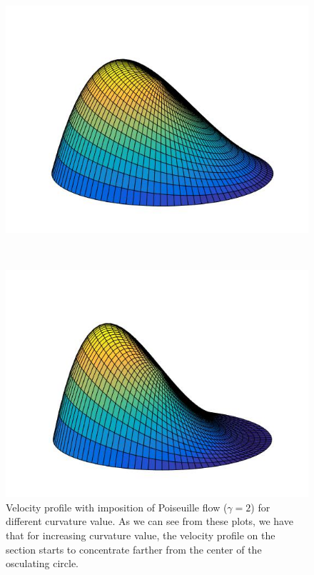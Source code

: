 \documentclass[a4paper]{report}
\begin{document}
\begin{figure}[htbp]
\begin{minipage}[c]{.30\textwidth}
\caption{$\kappa R=0.3$}
\end{minipage}%
\hspace{10mm}%
\begin{minipage}[c]{.30\textwidth}
\includegraphics[width=.70\textwidth]{k05}
\caption{$\kappa R=0.5$}
\end{minipage}%
\\
\begin{minipage}[c]{.30\textwidth}
\includegraphics[width=.70\textwidth]{k1}
\caption{$\kappa R=1.0$}
\end{minipage}
\caption{Velocity profile with imposition of Poiseuille flow ($\gamma =2$) for different curvature value. As we can see from these plots, we have that for increasing curvature value, the velocity profile on the section starts to concentrate farther from the center of the osculating circle.}
\end{figure}
\end{document}
